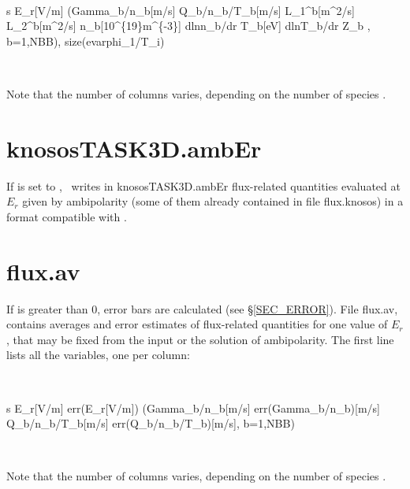 \

{\ttfamily s E\_r[V/m] (\tbl Gamma\_b/n\_b[m/s]  Q\_b/n\_b/T\_b[m/s]  L\_1\^{}b[m\^{}2/s] L\_2\^{}b[m\^{}2/s]  n\_b[10\^{}\{19\}m\^{}\{-3\}] dlnn\_b/dr T\_b[eV]  dlnT\_b/dr Z\_b , b=1,NBB), size(e\tbl varphi\_1/T\_i)}

\

Note that the number of columns varies, depending on the number of species .




\section{\ttfamily knososTASK3D.ambEr}

If  is set to \true, \KNOSOS~writes in {\ttfamily knososTASK3D.ambEr} flux-related quantities evaluated at $E_r$ given by ambipolarity (some of them already contained in file {\ttfamily flux.knosos}) in a format compatible with \TASKTD. %





\section{\ttfamily flux.av}

If  is greater than 0, error bars are calculated (see \S\ref{SEC_ERROR}). File {\ttfamily flux.av}, contains averages and error estimates of flux-related quantities for one value of $E_r$, that may be fixed from the input or the solution of ambipolarity. The first line lists all the variables, one per column:

\

{\ttfamily s E\_r[V/m] err(E\_r[V/m]) (\tbl Gamma\_b/n\_b[m/s]  err(Gamma\_b/n\_b)[m/s]  Q\_b/n\_b/T\_b[m/s]  err(Q\_b/n\_b/T\_b)[m/s], b=1,NBB)}


\

Note that the number of columns varies, depending on the number of species .


